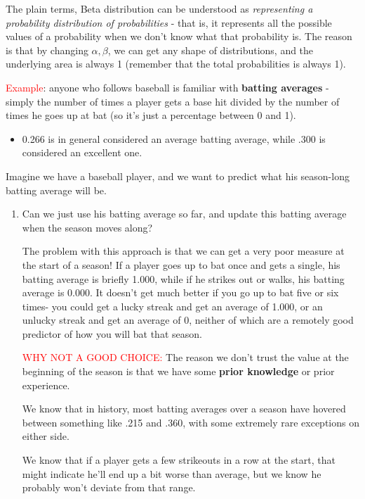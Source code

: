 The plain terms, Beta distribution can be understood as {\it representing a
probability distribution of probabilities} - that is, it represents all the
possible values of a probability when we don't know what that probability is.
The reason is that by changing $\alpha, \beta$, we can get any shape of
distributions, and the underlying area is always 1 (remember that the total
probabilities is always 1).

\begin{mdframed}
 
\textcolor{red}{Example}: anyone who follows baseball is familiar with {\bf batting
averages} - simply the number of times a player gets a base hit divided by the
number of times he goes up at bat (so it's just a percentage between 0 and 1).

\begin{itemize}
  \item  0.266 is in general considered an average batting average, while .300 is
considered an excellent one.    
\end{itemize}

Imagine we have a baseball player, and we want to predict what his season-long
batting average will be.
\begin{enumerate}
  
  \item Can we just use his batting average so far, and update this batting average when the season moves along?
  
  
The problem with this approach is that we can get a very poor measure at the
start of a season! If a player goes up to bat once and gets a single, his
batting average is briefly 1.000, while if he strikes out or walks, his batting
average is 0.000. It doesn’t get much better if you go up to bat five or six
times- you could get a lucky streak and get an average of 1.000, or an unlucky
streak and get an average of 0, neither of which are a remotely good predictor
of how you will bat that season.

\textcolor{red}{WHY NOT A GOOD CHOICE:} The reason we don't trust the value at the beginning 
of the season is that we have some {\bf prior knowledge}  or prior experience. 
  
  We know that in history, most batting averages over a season have hovered
  between something like .215 and .360, with some extremely rare exceptions on
  either side.
  
  We know that if a player gets a few strikeouts in a row at the start, that
  might indicate he’ll end up a bit worse than average, but we know he probably
  won’t deviate from that range.


\end{enumerate}
\end{mdframed}
